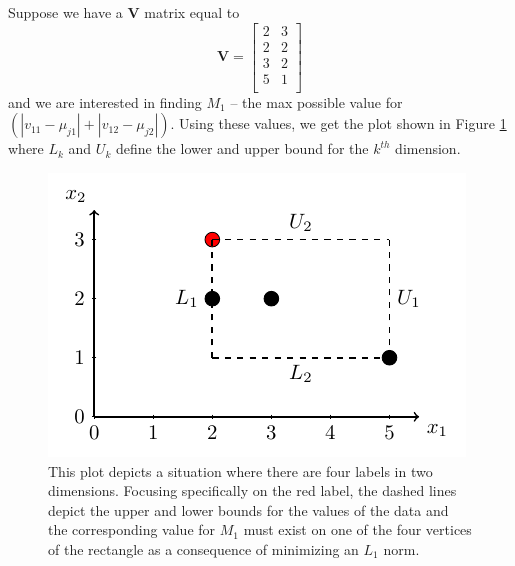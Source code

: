 \documentclass[../thesis.tex]{subfiles}
\begin{document}
Suppose we have a $\mathbf{V}$ matrix equal to
\begin{equation*}
    \mathbf{V} =
    \begin{bmatrix}
        2 & 3 \\
        2 & 2 \\
        3 & 2 \\
        5 & 1 \\
    \end{bmatrix}
\end{equation*}
and we are interested in finding $M_1$ -- the max possible value for
$\left(|v_{11} - \mu_{j1}| + |v_{12} - \mu_{j2}|\right)$. Using these values, we
get the plot shown in Figure \ref{fig:big-m-plot} where $L_k$ and $U_k$ define
the lower and upper bound for the $k^{th}$ dimension.
\begin{figure}
    \centering
    \includegraphics{images/big-m-plot.pdf}
    \caption[Big $M$ Inference Example]{This plot depicts a situation where
    there are four labels in two dimensions. Focusing specifically on the red
    label, the dashed lines depict the upper and lower bounds for the values of
    the data and the corresponding value for $M_1$ must exist on one of the four
    vertices of the rectangle as a consequence of minimizing an $L_1$ norm.}
    \label{fig:big-m-plot}
\end{figure}
\end{document}
